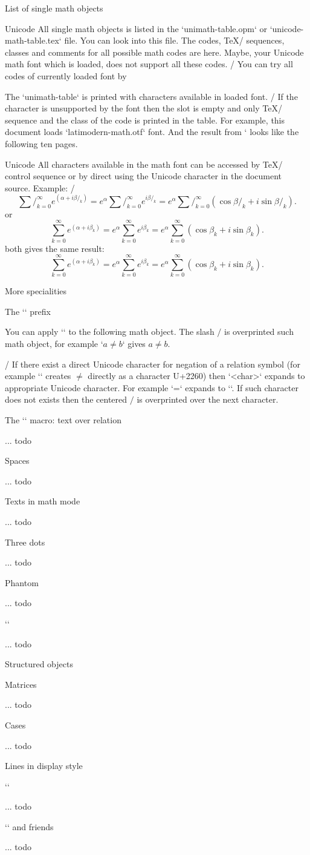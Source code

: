 \secc[objects] List of single math objects

\new Unicode
All single math objects is listed in the `unimath-table.opm` or
`unicode-math-table.tex` file. You can
look into this file. The codes, \TeX/ sequences, classes and comments
for all possible math codes are here. Maybe, your Unicode math font which is loaded,
does not support all these codes. 
\new \OpTeX/
You can try all codes of currently loaded font by
\begtt

\endtt
The `unimath-table` is printed with characters available in loaded font.
\new \OpTeX/
If the character is unsupported by the font then the slot is empty and only
\TeX/ sequence and the class of the code is printed in the table.
For example, this document loads `latimodern-math.otf` font.
And the result from ` looks like the following ten
pages.

\bigskip

\bigskip

\new Unicode
All characters available in the math font can be accessed by \TeX/ control
sequence or by direct using the Unicode character in the document source.
Example:
\begtt \adef/{}
$$ 
   \sum/_{k=0}^\infty e^{(\alpha+i\beta/_k)} = 
   e^\alpha \sum/_{k=0}^\infty e^{i\beta/_k} = 
   e^\alpha \sum/_{k=0}^\infty (\cos\beta/_k + i\sin\beta/_k). 
$$
\endtt
or
\begtt \ttspec
$$
   ∑_{k=0}^∞ e^{(α + iβ_k)} = e^α ∑_{k=0}^∞ e^{iβ_k} 
                            = e^α ∑_{k=0}^∞ (\cos β_k + i\sin β_k). 
$$
\endtt
both gives the same result:
$$
  ∑_{k=0}^∞ e^{(α + iβ_k)} = e^α ∑_{k=0}^∞ e^{iβ_k} 
                           = e^α ∑_{k=0}^∞ (\cos β_k + i\sin β_k).
$$

\sec More specialities

\secc The `\not` prefix

You can apply `\not` to the following math object.
The slash $/$ is overprinted such math object, for example 
`$a \not= b$` gives $a \not= b$.

\new \OpTeX/
If there exist a direct Unicode character for negation of a relation symbol
(for example `\ne` creates $\ne$ directly as a character U+2260) 
then `\not<char>` expands to appropriate Unicode character. 
For example `\not=` expands to `\ne`. If such character does not exists then
the centered $/$ is overprinted over the next character. 

\secc The `\bulidrel` macro: text over relation

... todo

\secc Spaces

... todo

\secc Texts in math mode

... todo

\secc Three dots

... todo

\secc Phantom

... todo

\secc `\vcenter`

... todo

\sec Structured objects

\secc Matrices

... todo

\secc Cases

... todo

\sec Lines in display style

\secc `\displaylines`

... todo

\secc `\eqalign` and friends

... todo

\bye
